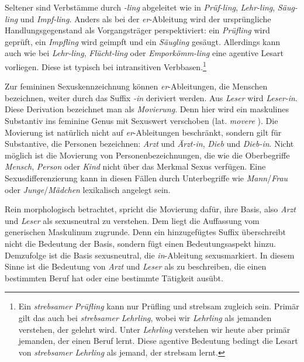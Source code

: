 Seltener sind Verbstämme durch \textit{-ling} abgeleitet wie in \textit{Prüf-ling}, \textit{Lehr-ling}, \textit{Säug-ling} und \textit{Impf-ling}. Anders als bei der \textit{er}-Ableitung wird der ursprüngliche Handlungsgegenstand als Vorgangsträger perspektiviert: ein \textit{Prüfling} wird geprüft, ein \textit{Impfling} wird geimpft und ein \textit{Säugling} gesäugt. Allerdings kann auch wie bei \textit{Lehr-ling}, \textit{Flücht-ling} oder \textit{Emporkömm-ling} eine agentive Lesart vorliegen. Diese ist typisch bei intransitiven Verbbasen.\footnote{Ein \textit{strebsamer Prüfling} kann nur Prüfling und strebsam zugleich sein. Primär gilt das auch bei \textit{strebsamer Lehrling}, wobei wir \textit{Lehrling} als jemanden verstehen, der gelehrt wird. Unter \textit{Lehrling} verstehen wir heute aber primär jemanden, der einen Beruf lernt. Diese agentive Bedeutung bedingt die Lesart von \textit{strebsamer Lehrling} als jemand, der strebsam lernt.}

\label{subsubsection:in}

Zur femininen Sexuskennzeichnung können \textit{er}-Ableitungen, die Menschen bezeichnen, weiter durch das Suffix \textit{-in} deriviert werden. Aus \textit{Leser} wird \textit{Leser-in}. Diese Derivation bezeichnet man als \textit{Movierung}. Denn hier wird ein maskulines Substantiv ins feminine Genus mit Sexuswert verschoben (lat. \textit{movere} ). Die Movierung ist natürlich nicht auf \textit{er}-Ableitungen beschränkt, sondern gilt für Substantive, die Personen bezeichnen: \textit{Arzt} und \textit{Ärzt-in}, \textit{Dieb} und \textit{Dieb-in}. Nicht möglich ist die Movierung von Personenbezeichnungen, die wie die Oberbegriffe \textit{Mensch}, \textit{Person} oder \textit{Kind} nicht über das Merkmal Sexus verfügen. Eine Sexusdifferenzierung kann in diesen Fällen durch Unterbegriffe wie \textit{Mann}/\textit{Frau} oder \textit{Junge}/\textit{Mädchen} lexikalisch angelegt sein.

Rein morphologisch betrachtet, spricht die Movierung dafür, ihre Basis, also \zB \textit{Arzt} und \textit{Leser} als sexusneutral zu verstehen. Dem liegt die Auffassung vom generischen Maskulinum zugrunde. Denn ein hinzugefügtes Suffix überschreibt nicht die Bedeutung der Basis, sondern fügt einen Bedeutungsaspekt hinzu. Demzufolge ist die Basis sexusneutral, die \textit{in}-Ableitung sexusmarkiert. In diesem Sinne ist die Bedeutung von \textit{Arzt} und \textit{Leser} als  zu beschreiben, die einen bestimmten Beruf hat oder eine bestimmte Tätigkeit ausübt.

